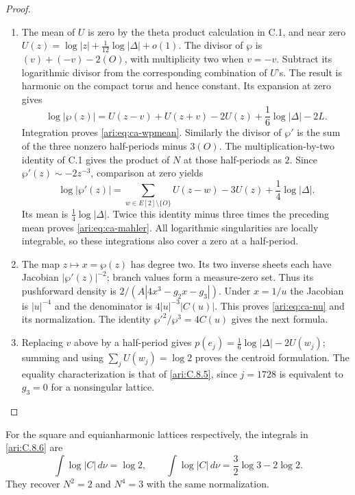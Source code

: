 \begin{proof}
\begin{enumerate}[label=\arabic*.,leftmargin=*]
\item The mean of $U$ is zero by the theta product calculation in C.1,
and near zero
$U(z)=\log|z|+\frac1{12}\log|\Delta|+o(1)$.
The divisor of $\wp$ is $(v)+(-v)-2(O)$, with multiplicity
two when $v=-v$. Subtract its logarithmic divisor from the
corresponding combination of $U$'s. The result is harmonic
on the compact torus and hence constant. Its expansion at
zero gives
\[
 \log|\wp(z)|=U(z-v)+U(z+v)-2U(z)
                  +\frac16\log|\Delta|-2L.
\]
Integration proves \eqref{ari:eq:ca-wpmean}.
Similarly the divisor of $\wp'$ is the sum of the three
nonzero half-periods minus $3(O)$. The multiplication-by-two
identity of C.1 gives the product of $N$ at those half-periods
as $2$. Since $\wp'(z)\sim-2z^{-3}$, comparison at zero yields
\[
 \log|\wp'(z)|=\sum_{w\in E[2]\setminus\{O\}}U(z-w)-3U(z)
                         +\frac14\log|\Delta|.
\]
Its mean is $\frac14\log|\Delta|$. Twice this identity minus
three times the preceding mean proves \eqref{ari:eq:ca-mahler}.
All logarithmic singularities are locally integrable, so these
integrations also cover a zero at a half-period.

\item The map $z\mapsto x=\wp(z)$ has degree two. Its two inverse
sheets each have Jacobian $|\wp'(z)|^{-2}$; branch values form
a measure-zero set. Thus its pushforward density is
$2/(A|4x^3-g_2x-g_3|)$. Under $x=1/u$ the Jacobian is
$|u|^{-4}$ and the denominator is $4|u|^{-3}|C(u)|$.
This proves \eqref{ari:eq:ca-nu} and its normalization. The identity
$\wp'^2/\wp^3=4C(u)$ gives the next formula.

\item Replacing $v$ above by a half-period gives
$p(e_j)=\frac16\log|\Delta|-2U(w_j)$; summing and using
$\sum_jU(w_j)=\log2$ proves the centroid formulation.
The equality characterization is that of \ref{ari:C.8.5},
since $j=1728$ is equivalent to $g_3=0$ for a nonsingular lattice.
\end{enumerate}
\end{proof}

\begin{proposition}\hypertarget{tag-001U}{}\label{ari:C.8.7}

For the square and equianharmonic lattices respectively, the
integrals in \ref{ari:C.8.6} are
\[
 \int\log|C|\,d\nu=\log2,\qquad
 \int\log|C|\,d\nu=\frac32\log3-2\log2.
\]
They recover $N^2=2$ and $N^4=3$ with the same normalization.
\end{proposition}


